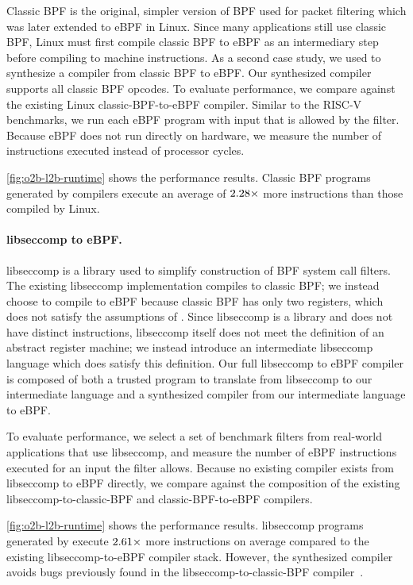 Classic BPF is the original, simpler version of BPF used for packet filtering which
was later extended to eBPF in Linux.
%
Since many applications still use classic BPF, Linux must first compile classic BPF
to eBPF as an intermediary step before compiling to machine instructions.
%
As a second case study, we used \jitsynth to synthesize a compiler from classic BPF to eBPF.
%
Our synthesized compiler supports all classic BPF opcodes.
%
To evaluate performance, we compare against the existing
Linux classic-BPF-to-eBPF compiler.
%
Similar to the RISC-V benchmarks, we run each eBPF program
with input that is allowed by the filter.
%
Because eBPF does not run directly on hardware, we measure
the number of instructions executed instead of processor cycles.


\autoref{fig:o2b-l2b-runtime} shows the performance results.
%
Classic BPF programs generated by \jitsynth compilers execute
an average of $2.28\times$ more instructions
than those compiled by Linux.


\paragraph{libseccomp to eBPF.}

libseccomp is a library used to simplify construction of BPF system call filters.
%
The existing libseccomp implementation compiles to classic BPF; we instead choose
to compile to eBPF because classic BPF has only two registers, which does not satisfy
the assumptions of \jitsynth.
%
Since libseccomp is a library and does not have distinct instructions, libseccomp itself does not meet the definition of an abstract register machine; we instead introduce
an intermediate libseccomp language which does satisfy this definition.
%
Our full libseccomp to eBPF compiler is composed of both a trusted program to translate from libseccomp to our intermediate language and a synthesized compiler from our intermediate language to eBPF.

To evaluate performance, we select a set of benchmark filters from real-world
applications that use libseccomp, and measure the number of eBPF instructions
executed for an input the filter allows.
%
Because no existing compiler exists from libseccomp to eBPF directly,
we compare against the composition of the existing libseccomp-to-classic-BPF and classic-BPF-to-eBPF compilers.


\autoref{fig:o2b-l2b-runtime} shows the performance results.
%
libseccomp programs generated by \jitsynth execute
$2.61\times$ more instructions on average
compared to the existing libseccomp-to-eBPF compiler stack.
%
However, the synthesized compiler avoids bugs previously found
in the libseccomp-to-classic-BPF compiler~\cite{lsc:bug}.
%
%
%




